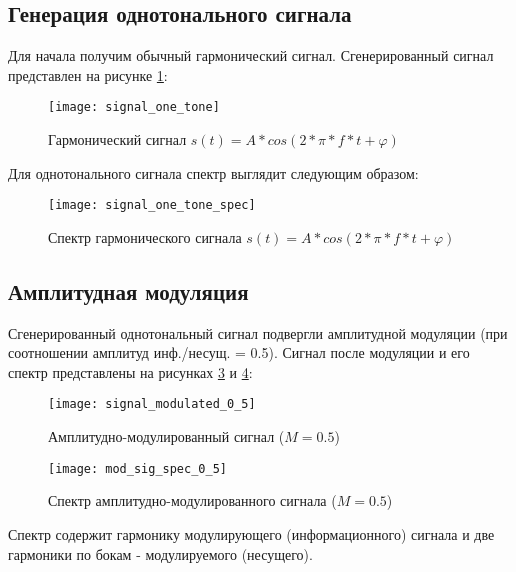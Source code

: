 \subsection{Генерация однотонального сигнала}
Для начала получим обычный гармонический сигнал. Сгенерированный сигнал представлен на рисунке \ref{pic:signal_one_tone}:
\begin{figure}[H]
	\begin{center}
		\texttt{[image: signal\_one\_tone]}
		\caption{Гармонический сигнал $s(t) = A*cos(2*\pi * f*t + \varphi)$} 
		\label{pic:signal_one_tone} %
	\end{center}
\end{figure}
Для однотонального сигнала спектр выглядит следующим образом:
\begin{figure}[H]
	\begin{center}
		\texttt{[image: signal\_one\_tone\_spec]}
		\caption{Спектр гармонического сигнала $s(t) = A*cos(2*\pi * f*t + \varphi)$} 
		\label{pic:signal_one_tone_spec} %
	\end{center}
\end{figure}

\subsection{Амплитудная модуляция}
Сгенерированный однотональный сигнал подвергли амплитудной модуляции (при соотношении амплитуд инф./несущ. = 0.5). Сигнал после модуляции и его спектр представлены на рисунках \ref{pic:signal_modulated_0_5} и \ref{pic:mod_sig_spec_0_5}:
\begin{figure}[H]
	\begin{center}
		\texttt{[image: signal\_modulated\_0\_5]}
		\caption{Амплитудно-модулированный сигнал ($M = 0.5$)} 
		\label{pic:signal_modulated_0_5} %
	\end{center}
\end{figure}

\begin{figure}[H]
	\begin{center}
		\texttt{[image: mod\_sig\_spec\_0\_5]}
		\caption{Спектр амплитудно-модулированного сигнала ($M = 0.5$)} 
		\label{pic:mod_sig_spec_0_5} %
	\end{center}
\end{figure}
Спектр содержит гармонику модулирующего (информационного) сигнала и две гармоники по бокам - модулируемого (несущего).


